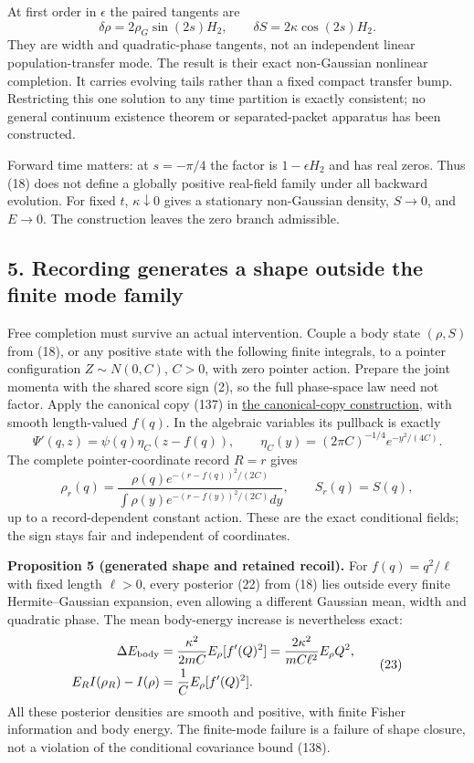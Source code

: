 \documentclass[11pt,a4paper]{article}
\begin{document}
At first order in \(\epsilon\) the paired tangents are
\[\delta\rho=2\rho_G\sin(2s)H_2,\qquad
\delta S=2\kappa\cos(2s)H_2.\tag{20}\] They are width and
quadratic-phase tangents, not an independent linear population-transfer
mode. The result is their exact non-Gaussian nonlinear completion. It
carries evolving tails rather than a fixed compact transfer bump.
Restricting this one solution to any time partition is exactly
consistent; no general continuum existence theorem or separated-packet
apparatus has been constructed.

Forward time matters: at \(s=-\pi/4\) the factor is \(1-\epsilon H_2\)
and has real zeros. Thus (18) does not define a globally positive
real-field family under all backward evolution. For fixed \(t\),
\(\kappa\downarrow0\) gives a stationary non-Gaussian density,
\(S\to0\), and \(E\to0\). The construction leaves the zero branch
admissible.

\hypertarget{recording-generates-a-shape-outside-the-finite-mode-family}{%
\subsection{5. Recording generates a shape outside the finite mode
family}\label{recording-generates-a-shape-outside-the-finite-mode-family}}

Free completion must survive an actual intervention. Couple a body state
\((\rho,S)\) from (18), or any positive state with the following finite
integrals, to a pointer configuration \(Z\sim N(0,C)\), \(C>0\), with
zero pointer action. Prepare the joint momenta with the shared score
sign (2), so the full phase-space law need not factor. Apply the
canonical copy (137) in
\protect\hyperlink{shared-score-preparations-and-canonical-records}{the
canonical-copy construction}, with smooth length-valued \(f(q)\). In the
algebraic variables its pullback is exactly
\[\Psi'(q,z)=\psi(q)\eta_C(z-f(q)),\qquad
\eta_C(y)=(2\pi C)^{-1/4}e^{-y^2/(4C)}.\tag{21}\] The complete
pointer-coordinate record \(R=r\) gives
\[\rho_r(q)=\frac{\rho(q)e^{-(r-f(q))^2/(2C)}}
 {\int\rho(y)e^{-(r-f(y))^2/(2C)}dy},\qquad
S_r(q)=S(q),\tag{22}\] up to a record-dependent constant action. These
are the exact conditional fields; the sign stays fair and independent of
coordinates.

\textbf{Proposition 5 (generated shape and retained recoil).} For
\(f(q)=q^2/\ell\) with fixed length \(\ell>0\), every posterior (22)
from (18) lies outside every finite Hermite--Gaussian expansion, even
allowing a different Gaussian mean, width and quadratic phase. The mean
body-energy increase is nevertheless exact: \[\begin{aligned}
\Delta E_{\rm body}
 &=\frac{\kappa^2}{2mC}E_\rho[f'(Q)^2]
 =\frac{2\kappa^2}{mC\ell^2}E_\rho Q^2,\\
E_R I(\rho_R)-I(\rho)&=\frac1C E_\rho[f'(Q)^2].
\end{aligned}\tag{23}\] All these posterior densities are smooth and
positive, with finite Fisher information and body energy. The
finite-mode failure is a failure of shape closure, not a violation of
the conditional covariance bound (138).
\end{document}
